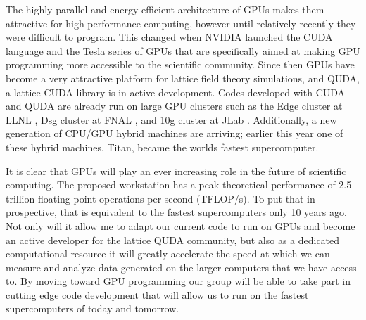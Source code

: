 \documentclass[11pt]{article}
\begin{document}
 The highly parallel and energy efficient architecture of GPUs makes them attractive for high performance computing, however until relatively recently they were difficult to program.  
 This changed when NVIDIA launched the CUDA language and the Tesla series of GPUs that are specifically aimed at making GPU programming more accessible to the scientific community.
  Since then GPUs have become a very attractive platform for lattice field theory simulations, and QUDA, a lattice-CUDA library \cite{QUDA1,QUDA2,QUDA3} is in active development.
   Codes developed with CUDA and QUDA are already run on large GPU clusters such as the Edge cluster at LLNL \cite{Edge}, Dsg cluster at FNAL \cite{Dsg}, and 10g cluster at JLab \cite{10g}.
   Additionally, a new generation of CPU/GPU hybrid machines are arriving; earlier this year one of these hybrid machines, Titan, became the worlds fastest supercomputer\cite{Titan}.

  It is clear that GPUs will play an ever increasing role in the future of scientific computing. 
  The proposed workstation has a peak theoretical performance of 2.5 trillion floating point operations per second (TFLOP/s).
  To put that in prospective, that is equivalent to the fastest supercomputers only 10 years ago.
  Not only will it allow me to adapt our current code to run on GPUs and become an active developer for the lattice QUDA community, but also as a dedicated computational resource it will greatly accelerate the speed at which we can measure and analyze data generated on the larger computers that we have access to.
  By moving toward GPU programming our group will be able to take part in cutting edge code development that will allow us to run on the fastest supercomputers of today and tomorrow.
    
\end{document}
